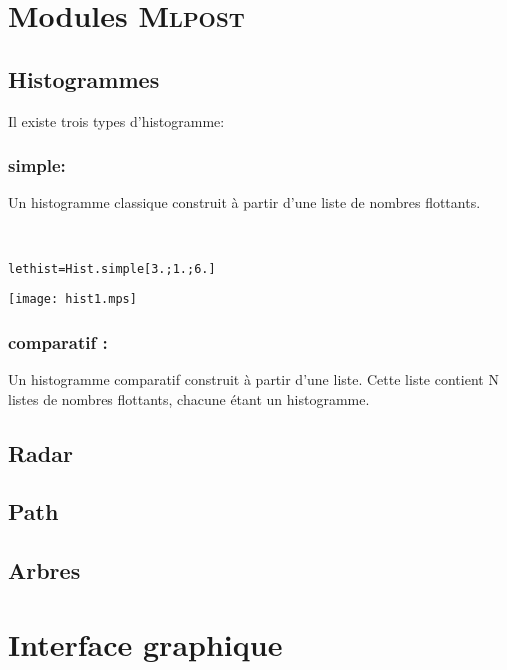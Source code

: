 \documentclass[a4paper,12pt]{article}
\newcommand{\mlpost}{\textsc{Mlpost}}
\begin{document}
\section{Modules \mlpost}


\subsection{Histogrammes}
Il existe trois types d'histogramme:

\subsubsection{simple:}
Un histogramme classique construit à partir d'une liste de nombres
flottants.

~\\

\begin{minipage}{0.5\linewidth}
  \begin{alltt}
    let hist = Hist.simple [3.;1.;6.]
  \end{alltt}
\end{minipage}
\begin{minipage}{0.5\linewidth}
\begin{center}
\texttt{[image: hist1.mps]}
\end{center}
\end{minipage}

\subsubsection{comparatif :} 
Un histogramme comparatif construit à partir d'une liste. Cette liste
contient N listes de nombres flottants, chacune étant un histogramme.

\subsection{Radar}
\subsection{Path}
\subsection{Arbres}

\cite{tree}

\section{Interface graphique}
\end{document}
